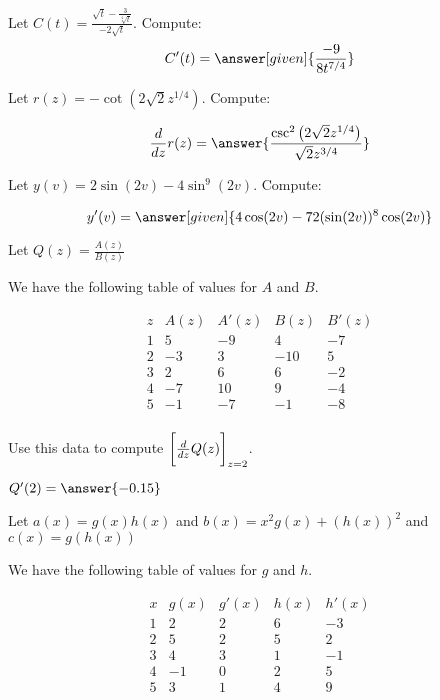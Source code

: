 \documentclass[handout]{ximera}
\begin{document}
\begin{exercise}
Let $C(t) = \frac{ \sqrt{t}-\frac{3}{\sqrt[4]{t}}}{-2 \sqrt{t}}$. Compute:
\[
C'(t)
=\answer[given]{\frac{-9}{8 {t}^{7/4}}}
\]
\end{exercise}

\begin{exercise}
Let $r(z) = -\cot \left(2 \sqrt{2} {z}^{1/4}\right)$. Compute:

\[
\dd{z}r(z)
=\answer{\frac{\csc ^2\left(2 \sqrt{2} {z}^{1/4}\right)}{\sqrt{2} {z}^{3/4}}}
\]
\end{exercise}

\begin{exercise}
Let $y(v) = 2 \sin (2 v)-4 \sin ^9(2 v)$. Compute:

\[
y'(v)
=\answer[given]{4 \cos (2 v)-72 (\sin (2 v))^8 \cos (2 v)}
\]
\end{exercise}


\begin{exercise}
Let $Q(z) = \frac{A(z)}{B(z)}$

We have the following table of values for $A$ and $B$.

\[
\begin{array}{c|c|c|c|c}
 z & A(z) & A'(z) & B(z) & B'(z)\\ \hline
 1 & 5 & -9 & 4 & -7\\ 
 2 & -3 & 3 & -10 & 5\\
 3 & 2 &	6&	6	&-2\\
 4 & -7  &	10&	9	&-4\\
 5 & -1&	-7	&-1&	-8\\
\end{array}
\]




Use this data to compute $\bigg[ \frac{\mathop{}\!d}{\mathop{}\!d z} Q(z) \bigg]_{z = 2}$.

	$Q'(2) = \answer{-0.15}$

\end{exercise}


Let $a(x)=g(x)h(x)$ and $b(x) = x^2g(x)+(h(x))^2$ and $c(x)=g(h(x))$

We have the following table of values for $g$ and $h$.

\[
\begin{array}{c|c|c|c|c}
 x & g(x) & g'(x) & h(x) & h'(x)\\ \hline
 1 & 2 & 2 & 6 & -3\\ 
 2 & 5 & 2 & 5 & 2\\
 3 & 4 & 3 & 1 & -1\\ 
 4 & -1 & 0 & 2 & 5\\ 
 5 & 3 & 1 & 4 & 9\\ 
\end{array}
\]
\end{document}
